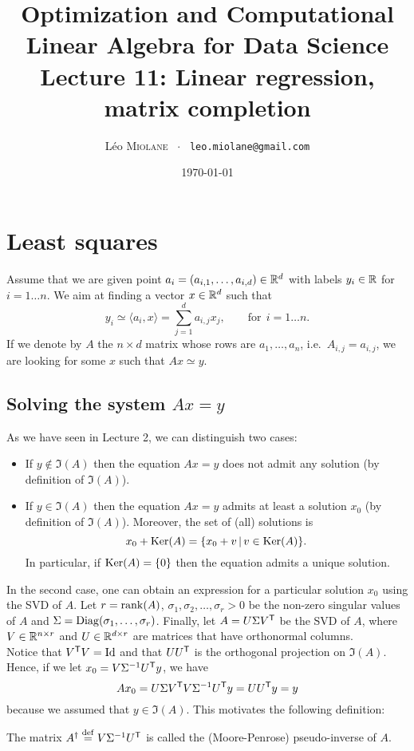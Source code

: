 \documentclass[11pt,nocut]{article}
\title{\vspace{-2.0cm}%
	Optimization and Computational Linear Algebra for Data Science\\
Lecture 11: Linear regression, matrix completion}
\author{Léo \textsc{Miolane} \ $\cdot$ \ \texttt{leo.miolane@gmail.com}}
\date{\today}
\begin{document}
\maketitle


\section{Least squares}

Assume that we are given point $a_i = (a_{i,1}, \dots, a_{i,d}) \in \mathbb{R}^d$ with labels $y_i \in \mathbb{R}$ for $i=1 \dots n$.
We aim at finding a vector $x\in\mathbb{R}^d$ such that
$$
y_i \simeq \langle a_i, x \rangle = \sum_{j=1}^d a_{i,j} x_j, \qquad \text{for} \ \ i=1 \dots n.
$$
If we denote by $A$ the $n \times d$ matrix whose rows are $a_1, \dots, a_n$, i.e.\ $A_{i,j} = a_{i,j}$, we are looking for some $x$ such that $Ax \simeq y$.

\subsection{Solving the system $Ax=y$}

As we have seen in Lecture 2, we can distinguish two cases:
\begin{itemize}
	\item If $y \not\in \Im(A)$ then the equation $Ax=y$ does not admit any solution (by definition of $\Im(A)$).
	\item If $y \in \Im(A)$ then the equation $Ax=y$ admits at least a solution $x_0$ (by definition of $\Im(A)$). Moreover, the set of (all) solutions is
		$$
		x_0 + {{\rm Ker}}(A) = \{x_0 + v \, | \, v \in {{\rm Ker}}(A) \}.
		$$
		In particular, if ${{\rm Ker}}(A) = \{0\}$ then the equation admits a unique solution.
\end{itemize}

In the second case, one can obtain an expression for a particular solution $x_0$ using the SVD of $A$.
Let $r = {{\rm rank}}(A)$, $\sigma_1, \sigma_2, \dots, \sigma_r >0$ be the non-zero singular values of $A$ and $\Sigma = {{\rm Diag}}(\sigma_1, \dots, \sigma_r)$. Finally, let $A = U \Sigma V^{{\sf T}}$ be the SVD of $A$, where $V \in \mathbb{R}^{n \times r}$ and $U \in \mathbb{R}^{d \times r}$ are matrices that have orthonormal columns. 
\\

Notice that $V^{{\sf T}} V = {{\rm Id}}$ and that $U U^{{\sf T}}$ is the orthogonal projection on $\Im(A)$. Hence, if we let $x_0 = V \Sigma^{-1} U^{{\sf T}} y$, we have
$$
A x_0 =U \Sigma V^{{\sf T}}V \Sigma^{-1} U^{{\sf T}} y
= U U^{{\sf T}} y = y
$$
because we assumed that $y \in \Im(A)$.
This motivates the following definition:
\begin{definition}
	The matrix $A^{\dagger} \overset{\rm def}{=} V \Sigma^{-1} U^{{\sf T}}$ is called the (Moore-Penrose) pseudo-inverse of $A$.
\end{definition}
\end{document}
